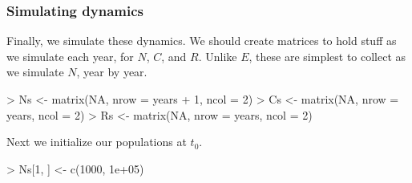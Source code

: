 \subsubsection{Simulating dynamics}
Finally, we simulate these dynamics. We should create matrices to hold stuff as we simulate each year, for $N$, $C$, and $R$. Unlike $E$, these are simplest to collect as we simulate $N$, year by year.
\begin{Schunk}
\begin{Sinput}
> Ns <- matrix(NA, nrow = years + 1, ncol = 2)
> Cs <- matrix(NA, nrow = years, ncol = 2)
> Rs <- matrix(NA, nrow = years, ncol = 2)
\end{Sinput}
\end{Schunk}
Next we initialize our populations at $t_0$.
\begin{Schunk}
\begin{Sinput}
> Ns[1, ] <- c(1000, 1e+05)
\end{Sinput}
\end{Schunk}

